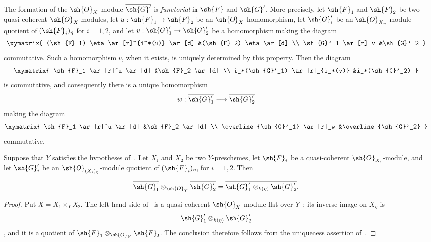 \begin{env}[2.8.3]
\label{IV.2.8.3}
The formation of the $\sh{O}_X$-module $\overline{\sh{G}'}$ is
\emph{functorial} in $\sh{F}$ and $\sh{G}'$. More precisely, let
$\sh{F}_1$ and $\sh{F}_2$ be two quasi-coherent
$\sh{O}_X$-modules, let
$u:\sh{F}_1\to\sh{F}_2$ be an $\sh{O}_X$-homomorphism, let
$\sh{G}'_i$ be an $\sh{O}_{X_\eta}$-module quotient of
$(\sh{F}_i)_\eta$ for $i=1,2$, and let
$v:\sh{G}'_1\to\sh{G}'_2$ be a homomorphism making the diagram
\[
\xymatrix{
  (\sh{F}_1)_\eta \ar[r]^{i^*(u)} \ar[d]
    &(\sh{F}_2)_\eta \ar[d] \\
  \sh{G}'_1 \ar[r]_v
    &\sh{G}'_2
}
\]
commutative. Such a homomorphism $v$, when it exists, is uniquely
determined by this property. Then the diagram
\[
\xymatrix{
  \sh{F}_1 \ar[r]^u \ar[d]
    &\sh{F}_2 \ar[d] \\
  i_*(\sh{G}'_1) \ar[r]_{i_*(v)}
    &i_*(\sh{G}'_2)
}
\]
is commutative, and consequently there is a unique homomorphism
\[
  w:\overline{\sh{G}'_1}\longrightarrow\overline{\sh{G}'_2}
\]
making the diagram
\[
\xymatrix{
  \sh{F}_1 \ar[r]^u \ar[d]
    &\sh{F}_2 \ar[d] \\
  \overline{\sh{G}'_1} \ar[r]_w
    &\overline{\sh{G}'_2}
}
\]
commutative.
\end{env}


\begin{proposition}[2.8.4]
\label{IV.2.8.4}
Suppose that $Y$ satisfies the hypotheses of~. Let
$X_1$ and $X_2$ be two $Y$-preschemes, let $\sh{F}_i$ be a
quasi-coherent $\sh{O}_{X_i}$-module, and let $\sh{G}'_i$ be an
$\sh{O}_{(X_i)_\eta}$-module quotient of $(\sh{F}_i)_\eta$, for
$i=1,2$. Then
\end{proposition}

\begin{env}[2.8.4.1]
\label{IV.2.8.4.1}
\[
  \overline{\sh{G}'_1}\otimes_{\sh{O}_Y}\overline{\sh{G}'_2}
    =
  \overline{\sh{G}'_1\otimes_{k(\eta)}\sh{G}'_2}.
\]
\end{env}

\begin{proof}
Put $X=X_1\times_Y X_2$. The left-hand side
of~ is a quasi-coherent $\sh{O}_X$-module flat over
$Y$~; its inverse image on $X_\eta$ is
\[
  \sh{G}'_1\otimes_{k(\eta)}\sh{G}'_2
\]
, and it is a quotient of
$\sh{F}_1\otimes_{\sh{O}_Y}\sh{F}_2$. The conclusion therefore
follows from the uniqueness assertion of~.
\end{proof}

